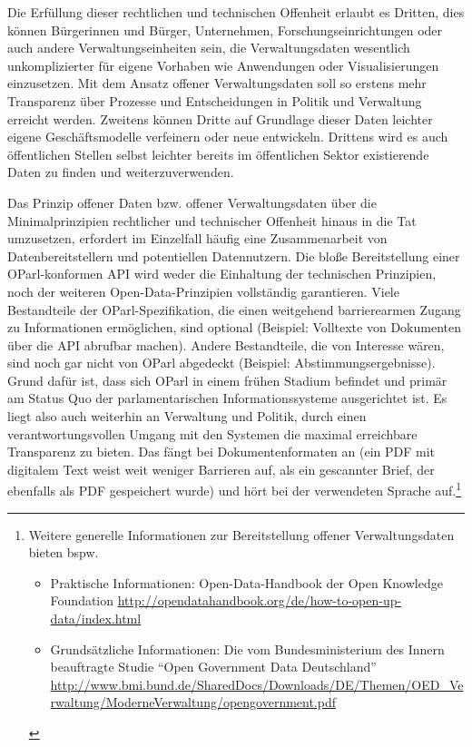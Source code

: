 \documentclass[,a4paper]{article}
\begin{document}
Die Erfüllung dieser rechtlichen und technischen Offenheit erlaubt es
Dritten, dies können Bürgerinnen und Bürger, Unternehmen,
Forschungseinrichtungen oder auch andere Verwaltungseinheiten sein, die
Verwaltungsdaten wesentlich unkomplizierter für eigene Vorhaben wie
Anwendungen oder Visualisierungen einzusetzen. Mit dem Ansatz offener
Verwaltungsdaten soll so erstens mehr Transparenz über Prozesse und
Entscheidungen in Politik und Verwaltung erreicht werden. Zweitens
können Dritte auf Grundlage dieser Daten leichter eigene
Geschäftsmodelle verfeinern oder neue entwickeln. Drittens wird es auch
öffentlichen Stellen selbst leichter bereits im öffentlichen Sektor
existierende Daten zu finden und weiterzuverwenden.

Das Prinzip offener Daten bzw. offener Verwaltungsdaten über die
Minimalprinzipien rechtlicher und technischer Offenheit hinaus in die
Tat umzusetzen, erfordert im Einzelfall häufig eine Zusammenarbeit von
Datenbereitstellern und potentiellen Datennutzern. Die bloße
Bereitstellung einer OParl-konformen API wird weder die Einhaltung der
technischen Prinzipien, noch der weiteren Open-Data-Prinzipien
vollständig garantieren. Viele Bestandteile der OParl-Spezifikation, die
einen weitgehend barrierearmen Zugang zu Informationen ermöglichen, sind
optional (Beispiel: Volltexte von Dokumenten über die API abrufbar
machen). Andere Bestandteile, die von Interesse wären, sind noch gar
nicht von OParl abgedeckt (Beispiel: Abstimmungsergebnisse). Grund dafür
ist, dass sich OParl in einem frühen Stadium befindet und primär am
Status Quo der parlamentarischen Informationssysteme ausgerichtet ist.
Es liegt also auch weiterhin an Verwaltung und Politik, durch einen
verantwortungsvollen Umgang mit den Systemen die maximal erreichbare
Transparenz zu bieten. Das fängt bei Dokumentenformaten an (ein PDF mit
digitalem Text weist weit weniger Barrieren auf, als ein gescannter
Brief, der ebenfalls als PDF gespeichert wurde) und hört bei der
verwendeten Sprache auf.\footnote{Weitere generelle Informationen zur
  Bereitstellung offener Verwaltungsdaten bieten bspw.

  \begin{itemize}
  \itemsep1pt\parskip0pt
  \item
    Praktische Informationen: Open-Data-Handbook der Open Knowledge
    Foundation
    \url{http://opendatahandbook.org/de/how-to-open-up-data/index.html}
  \item
    Grundsätzliche Informationen: Die vom Bundesministerium des Innern
    beauftragte Studie ``Open Government Data Deutschland''
    \url{http://www.bmi.bund.de/SharedDocs/Downloads/DE/Themen/OED_Verwaltung/ModerneVerwaltung/opengovernment.pdf}
  \end{itemize}}
\end{document}
